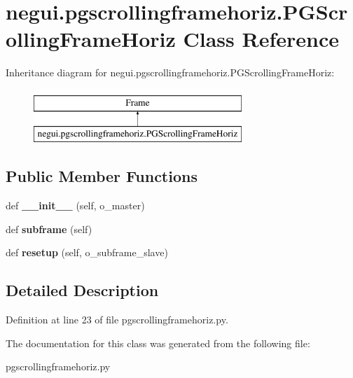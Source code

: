 \hypertarget{classnegui_1_1pgscrollingframehoriz_1_1PGScrollingFrameHoriz}{}\section{negui.\+pgscrollingframehoriz.\+P\+G\+Scrolling\+Frame\+Horiz Class Reference}
\label{classnegui_1_1pgscrollingframehoriz_1_1PGScrollingFrameHoriz}
Inheritance diagram for negui.\+pgscrollingframehoriz.\+P\+G\+Scrolling\+Frame\+Horiz\+:\begin{figure}[H]
\begin{center}
\leavevmode
\includegraphics[height=2.000000cm]{classnegui_1_1pgscrollingframehoriz_1_1PGScrollingFrameHoriz}
\end{center}
\end{figure}
\subsection*{Public Member Functions}
\begin{DoxyCompactItemize}
\item 
def {\bfseries \+\_\+\+\_\+init\+\_\+\+\_\+} (self, o\+\_\+master)\hypertarget{classnegui_1_1pgscrollingframehoriz_1_1PGScrollingFrameHoriz_ac1e2caea0f1d3317a0db1958c3bb3954}{}\label{classnegui_1_1pgscrollingframehoriz_1_1PGScrollingFrameHoriz_ac1e2caea0f1d3317a0db1958c3bb3954}

\item 
def {\bfseries subframe} (self)\hypertarget{classnegui_1_1pgscrollingframehoriz_1_1PGScrollingFrameHoriz_a058c76cac779d463da80f8e85c0bf534}{}\label{classnegui_1_1pgscrollingframehoriz_1_1PGScrollingFrameHoriz_a058c76cac779d463da80f8e85c0bf534}

\item 
def {\bfseries resetup} (self, o\+\_\+subframe\+\_\+slave)\hypertarget{classnegui_1_1pgscrollingframehoriz_1_1PGScrollingFrameHoriz_adf182ed6c170b053d958fa915a1411f0}{}\label{classnegui_1_1pgscrollingframehoriz_1_1PGScrollingFrameHoriz_adf182ed6c170b053d958fa915a1411f0}

\end{DoxyCompactItemize}


\subsection{Detailed Description}


Definition at line 23 of file pgscrollingframehoriz.\+py.



The documentation for this class was generated from the following file\+:\begin{DoxyCompactItemize}
\item 
pgscrollingframehoriz.\+py\end{DoxyCompactItemize}
